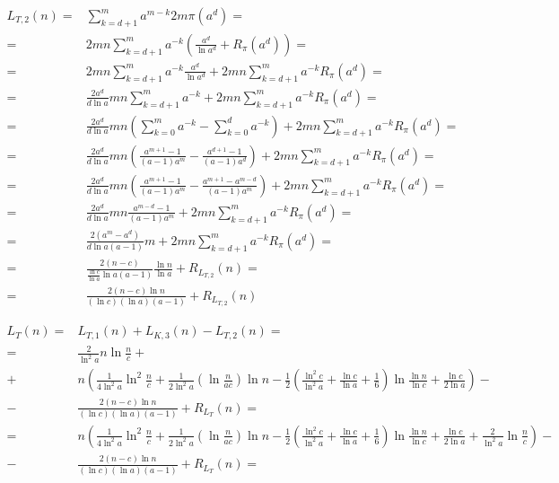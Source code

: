 \documentclass{article}
\begin{document}
\begin{align*}
L_{T,2}(n) =& \sum_{k=d+1}^{m} a^{m-k} 2 m \pi(a^d) = \\
=& 2 m n \sum_{k=d+1}^{m} a^{-k} \left( \frac{a^d}{\ln{a^d}} + R_{\pi}(a^d) \right) = \\
=& 2 m n \sum_{k=d+1}^{m} a^{-k} \frac{a^d}{\ln{a^d}} + 2 m n \sum_{k=d+1}^{m} a^{-k} R_{\pi}(a^d) = \\
=& \frac{2 a^d}{d \ln{a}} m n \sum_{k=d+1}^{m} a^{-k} + 2 m n \sum_{k=d+1}^{m} a^{-k} R_{\pi}(a^d) = \\
=& \frac{2 a^d}{d \ln{a}} m n \left( \sum_{k=0}^{m} a^{-k} - \sum_{k=0}^{d} a^{-k} \right) + 2 m n \sum_{k=d+1}^{m} a^{-k} R_{\pi}(a^d) = \\
=& \frac{2 a^d}{d \ln{a}} m n \left( \frac{a^{m+1}-1}{(a-1)a^m} - \frac{a^{d+1}-1}{(a-1)a^d} \right) + 2 m n \sum_{k=d+1}^{m} a^{-k} R_{\pi}(a^d) = \\
=& \frac{2 a^d}{d \ln{a}} m n \left( \frac{a^{m+1}-1}{(a-1)a^m} - \frac{a^{m+1}-a^{m-d}}{(a-1)a^m} \right) + 2 m n \sum_{k=d+1}^{m} a^{-k} R_{\pi}(a^d) = \\
=& \frac{2 a^d}{d \ln{a}} m n \frac{a^{m-d}-1}{(a-1)a^m} + 2 m n \sum_{k=d+1}^{m} a^{-k} R_{\pi}(a^d) = \\
=& \frac{2 \left( a^m - a^d \right)}{d \ln{a} (a-1)} m + 2 m n \sum_{k=d+1}^{m} a^{-k} R_{\pi}(a^d) = \\
=& \frac{2 \left( n - c \right)}{\frac{\ln{c}}{\ln{a}} \ln{a} (a-1)} \frac{\ln{n}}{\ln{a}} + R_{L_{T,2}}(n) = \\
=& \frac{2 \left( n - c \right) \ln{n} }{(\ln{c}) (\ln{a}) (a-1)} + R_{L_{T,2}}(n)
\end{align*}

\begin{align*}
L_T(n) =&  L_{T,1}(n) + L_{K,3}(n) - L_{T,2}(n) = \\
=& \frac{2}{\ln^2{a}} n \ln{\frac{n}{c}} + \\
+& n \left( \frac{1}{4 \ln^2{a}} \ln^2{\frac{n}{c}} + \frac{1}{2 \ln^2{a}} \left( \ln{\frac{n}{a c}} \right) \ln{n} - \frac{1}{2} \left( \frac{\ln^2{c}}{\ln^2{a}} + \frac{\ln{c}}{\ln{a}} + \frac{1}{6} \right) \ln{\frac{\ln{n}}{\ln{c}}} + \frac{\ln{c}}{2 \ln{a}} \right) - \\
-& \frac{2 \left( n - c \right) \ln{n} }{(\ln{c}) (\ln{a}) (a-1)} + R_{L_T}(n) = \\
=& n \left( \frac{1}{4 \ln^2{a}} \ln^2{\frac{n}{c}} + \frac{1}{2 \ln^2{a}} \left( \ln{\frac{n}{a c}} \right) \ln{n} - \frac{1}{2} \left( \frac{\ln^2{c}}{\ln^2{a}} + \frac{\ln{c}}{\ln{a}} + \frac{1}{6} \right) \ln{\frac{\ln{n}}{\ln{c}}} + \frac{\ln{c}}{2 \ln{a}} + \frac{2}{\ln^2{a}} \ln{\frac{n}{c}} \right) - \\
-& \frac{2 \left( n - c \right) \ln{n} }{(\ln{c}) (\ln{a}) (a-1)} + R_{L_T}(n) = \\
\end{align*}
\end{document}
